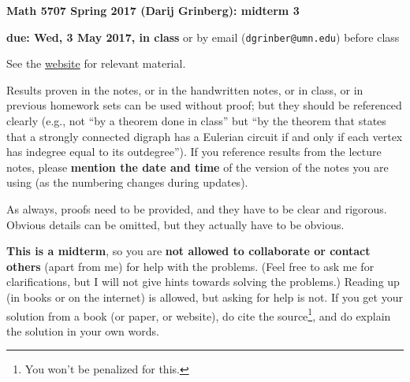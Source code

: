 \documentclass[numbers=enddot,12pt,final,onecolumn,notitlepage]{scrartcl}%
\theoremstyle{definition}
\begin{document}
\begin{center}
\textbf{Math 5707 Spring 2017 (Darij Grinberg): midterm 3}

\textbf{due: Wed, 3 May 2017, in class} or by email
(\texttt{dgrinber@umn.edu}) before class
\end{center}

See the \href{http://www.cip.ifi.lmu.de/~grinberg/t/17s}{website} for relevant material.

{\small Results proven in the notes, or in the handwritten notes, or in class, or in previous homework sets can be used without proof; but they should be referenced clearly (e.g., not ``by a theorem done in class'' but ``by the theorem that states that a strongly connected digraph has a Eulerian circuit if and only if each vertex has indegree equal to its outdegree'').
If you reference results from the lecture notes, please \textbf{mention the date and time} of the version of the notes you are using (as the numbering changes during updates).

As always, proofs need to be provided, and they have to be clear and rigorous. Obvious details can be omitted, but they actually have to be obvious.



\textbf{This is a midterm}, so you are \textbf{not allowed to collaborate or contact others} (apart from me) for help with the problems. (Feel free to ask me for clarifications, but I will not give hints towards solving the problems.) Reading up (in books or on the internet) is allowed, but asking for help is not. If you get your solution from a book (or paper, or website), do cite the source\footnote{You won't be penalized for this.}, and do explain the solution in your own words. }
\end{document}
